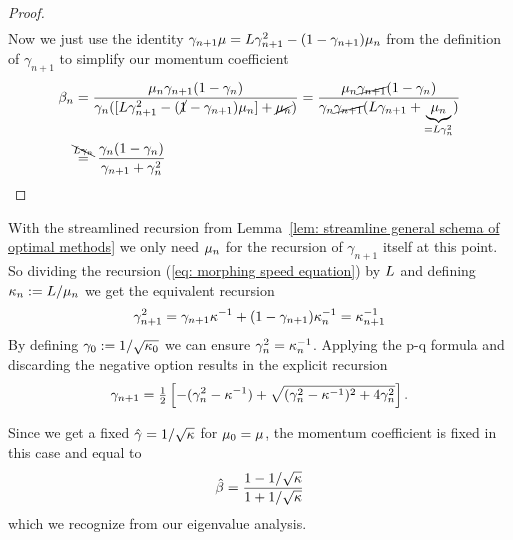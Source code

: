 \begin{proof}
\begin{align*}
	\end{align*}
	Now we just use the identity \(\gamma_{n+1}\mu = L\gamma_{n+1}^2 -
	(1-\gamma_{n+1})\mu_n\) from the definition of \(\gamma_{n+1}\) to simplify our
	momentum coefficient
	\begin{align*}
		\momCoeff_n
		&= \frac{\lbound_n \gamma_{n+1}(1-\gamma_n)}{
			\gamma_n([\ubound\gamma_{n+1}^2 - (\cancel{1}-\gamma_{n+1})\lbound_n] +\cancel{\lbound_n})
		}
		= \frac{\lbound_n\cancel{\gamma_{n+1}}(1-\gamma_n)}{
			\gamma_n\cancel{\gamma_{n+1}}(\ubound\gamma_{n+1} + \underbrace{\lbound_n}_{=\ubound\gamma_n^2})
		}\\
		&\lxeq{\bcancel{\ubound\gamma_n}} \frac{\gamma_n(1-\gamma_n)}{\gamma_{n+1} + \gamma_n^2}
		\qedhere
	\end{align*}
\end{proof}

With the streamlined recursion from Lemma~\ref{lem: streamline general schema of optimal methods}
we only need \(\mu_n\) for the recursion of \(\gamma_{n+1}\) itself at this
point. So dividing the recursion (\ref{eq: morphing speed equation}) by
\(L\) and defining \(\kappa_n:=L/\mu_n\) we get the equivalent
recursion
\begin{align}\label{eq: morphing speed recursion using condition}
	\gamma_{n+1}^2
	= \gamma_{n+1} \kappa^{-1} + (1-\gamma_{n+1})\kappa_n^{-1}
	= \kappa^{-1}_{n+1}
\end{align}
By defining \(\gamma_0:=1/\sqrt{\kappa_0}\) we can ensure
\(\gamma_n^2 = \kappa_n^{-1}\). Applying the p-q formula and discarding
the negative option results in the explicit recursion
\begin{align*}
	\gamma_{n+1}
	= \tfrac12 \left[
		-(\gamma_n^2 - \kappa^{-1})
		+ \sqrt{(\gamma_n^2 - \kappa^{-1})^2 + 4 \gamma_n^2}
	\right].
\end{align*}

Since we get a fixed \(\hat{\gamma}=1/\sqrt{\kappa}\) for
\(\mu_0=\mu\), the momentum coefficient is fixed in this case and equal to 
\begin{align*}
	\hat{\beta} = \frac{1-1/\sqrt{\kappa}}{1+1/\sqrt{\kappa}}
\end{align*}
which we recognize from our eigenvalue analysis.


